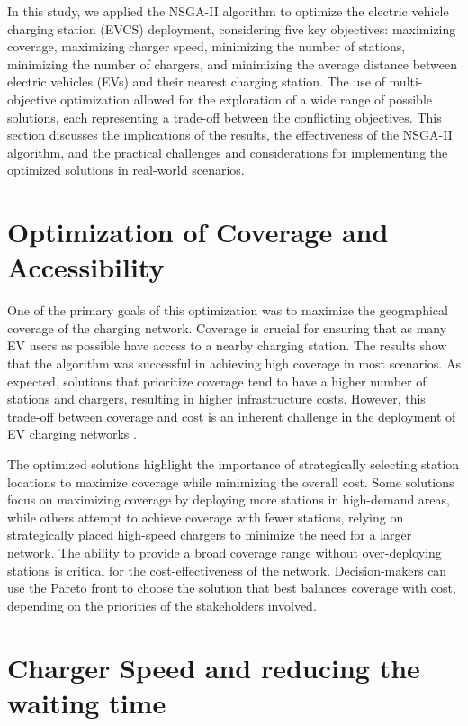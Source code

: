 In this study, we applied the NSGA-II algorithm to optimize the electric vehicle charging station (EVCS) deployment, considering five key objectives: maximizing coverage, maximizing charger speed, minimizing the number of stations, minimizing the number of chargers, and minimizing the average distance between electric vehicles (EVs) and their nearest charging station. The use of multi-objective optimization allowed for the exploration of a wide range of possible solutions, each representing a trade-off between the conflicting objectives. This section discusses the implications of the results, the effectiveness of the NSGA-II algorithm, and the practical challenges and considerations for implementing the optimized solutions in real-world scenarios.

\section{Optimization of Coverage and Accessibility}

One of the primary goals of this optimization was to maximize the geographical coverage of the charging network. Coverage is crucial for ensuring that as many EV users as possible have access to a nearby charging station. The results show that the algorithm was successful in achieving high coverage in most scenarios. As expected, solutions that prioritize coverage tend to have a higher number of stations and chargers, resulting in higher infrastructure costs. However, this trade-off between coverage and cost is an inherent challenge in the deployment of EV charging networks \citep{A multi-objective optimization model for electric vehicle charging station location planning}.

The optimized solutions highlight the importance of strategically selecting station locations to maximize coverage while minimizing the overall cost. Some solutions focus on maximizing coverage by deploying more stations in high-demand areas, while others attempt to achieve coverage with fewer stations, relying on strategically placed high-speed chargers to minimize the need for a larger network. The ability to provide a broad coverage range without over-deploying stations is critical for the cost-effectiveness of the network. Decision-makers can use the Pareto front to choose the solution that best balances coverage with cost, depending on the priorities of the stakeholders involved.

\section{Charger Speed and reducing the waiting time }


